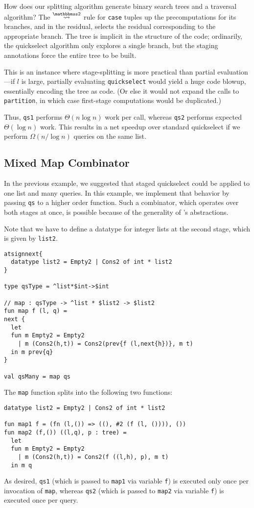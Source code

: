 How does our splitting algorithm generate binary search trees and a traversal
algorithm? The $\splittwosym$ rule for \texttt{case} tuples up the
precomputations for its branches, and in the residual, selects the residual
corresponding to the appropriate branch. The tree is implicit in the structure
of the code; ordinarily, the quickselect algorithm only explores a single
branch, but the staging annotations force the entire tree to be built.

This is an instance where stage-splitting is more practical than partial
evaluation---if $l$ is large, partially evaluating \texttt{quickselect} would
yield a huge code blowup, essentially encoding the tree as code. (Or else it
would not expand the calls to \texttt{partition}, in which case first-stage
computations would be duplicated.)

Thus, \texttt{qs1} performs $\Theta(n \log n)$ work per call, whereas
\texttt{qs2} performs expected $\Theta(\log n)$ work.  This results in a net
speedup over standard quickselect if we perform $\Omega(n / \log n)$ queries on
the same list. 




\subsection {Mixed Map Combinator}

In the previous example, we suggested that staged quickselect could be applied to one list and many queries.
In this example, we implement that behavior by passing \texttt{qs} to a higher order function.
Such a combinator, which operates over both stages at once, is possible because of the generality of \lang's abstractions.

Note that we have to define a datatype for integer lists at the second stage, which is given by \texttt{list2}.
\begin{lstlisting} 
atsignnext{
  datatype list2 = Empty2 | Cons2 of int * list2
}

type qsType = ^list*$int->$int

// map : qsType -> ^list * $list2 -> $list2
fun map f (l, q) = 
next {
  let 
  fun m Empty2 = Empty2
    | m (Cons2(h,t)) = Cons2(prev{f (l,next{h})}, m t)
  in m prev{q}
}

val qsMany = map qs
\end{lstlisting}
The \texttt{map} function splits into the following two functions:
\begin{lstlisting} 
datatype list2 = Empty2 | Cons2 of int * list2

fun map1 f = (fn (l,()) => ((), #2 (f (l, ()))), ())
fun map2 (f,()) ((l,q), p : tree) =
  let 
  fun m Empty2 = Empty2
    | m (Cons2(h,t)) = Cons2(f ((l,h), p), m t) 
  in m q
\end{lstlisting}

As desired, \texttt{qs1} (which is passed to \texttt{map1} via variable \texttt{f}) is executed only once per invocation of \texttt{map},
whereas \texttt{qs2} (which is passed to \texttt{map2} via variable \texttt{f}) is executed once per query.

